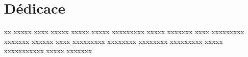 \chapter*{Dédicace}
{}
\adjustmtc
\thispagestyle{MyStyle}

\begin{center}
xx xxxxx xxxx xxxxx xxxxx xxxxx xxxxxxxxx xxxxx xxxxxxx xxxx xxxxxxxxx xxxxxxx xxxxxx xxxx xxxxxxxxx xxxxxxxx xxxxxxxx xxxxxxxxx xxxxx xxxxxxxxxxx xxxxx xxxxxxx 

\end{center}



